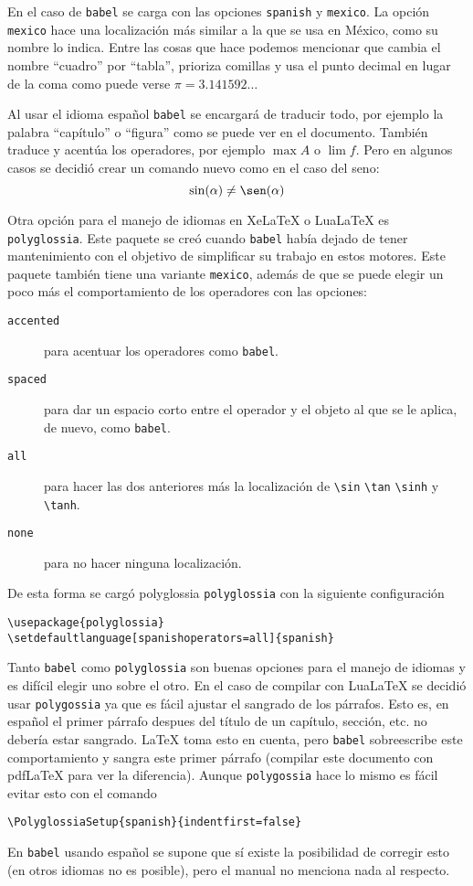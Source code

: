 En el caso de \texttt{babel} se carga con las opciones \texttt{spanish} y
\texttt{mexico}. La opción \texttt{mexico} hace una localización más similar
a la que se usa en México, como su nombre lo indica. Entre las cosas que
hace podemos mencionar que cambia el nombre ``cuadro'' por ``tabla'',
prioriza comillas y usa el punto decimal en lugar de la coma como puede
verse \(\pi=3.141592\ldots \)

Al usar el idioma español \texttt{babel} se encargará de traducir todo, por ejemplo la palabra ``capítulo'' o ``figura'' como se puede ver en el documento. También traduce y acentúa los operadores, por ejemplo \(\max A\) o \(\lim f\).%
\ifpdftex%
Pero en algunos casos se decidió crear un comando nuevo como en el caso del
seno:
\[
  \sin(\alpha)\ne\sen(\alpha)
\]
\fi

Otra opción para el manejo de idiomas en Xe\LaTeX{} o Lua\LaTeX{} es
\texttt{polyglossia}. Este paquete se creó cuando \texttt{babel} había
dejado de tener mantenimiento con el objetivo de simplificar su trabajo en
estos motores. Este paquete también tiene una variante \texttt{mexico},
además de que se puede elegir un poco más el comportamiento de los
operadores con las opciones:
\begin{description}
  \item[\texttt{accented}] para acentuar los operadores como \texttt{babel}.
  \item[\texttt{spaced}] para dar un espacio corto entre el operador y el objeto al que se le aplica, de nuevo, como \texttt{babel}.
  \item[\texttt{all}] para hacer las dos anteriores más la localización de \verb|\sin| \verb|\tan| \verb|\sinh| y \verb|\tanh|.
  \item[\texttt{none}] para no hacer ninguna localización.
\end{description}
De esta forma se cargó polyglossia \texttt{polyglossia} con la siguiente
configuración
\begin{flushleft}
  \verb|\usepackage{polyglossia}| \\
  \verb|\setdefaultlanguage[spanishoperators=all]{spanish}|
\end{flushleft}

Tanto \texttt{babel} como \texttt{polyglossia} son buenas opciones para el
manejo de idiomas y es difícil elegir uno sobre el otro. En el caso de
compilar con Lua\LaTeX{} se decidió usar \texttt{polygossia} ya que es fácil
ajustar el sangrado de los párrafos. Esto es, en español el primer párrafo
despues del título de un capítulo, sección, etc. no debería estar sangrado.
\LaTeX{} toma esto en cuenta, pero \texttt{babel} sobreescribe este
comportamiento y sangra este primer párrafo (compilar este documento con
pdf\LaTeX{} para ver la diferencia). Aunque \texttt{polygossia} hace lo
mismo es fácil evitar esto con el comando
\begin{flushleft}
  \verb|\PolyglossiaSetup{spanish}{indentfirst=false}|
\end{flushleft}
En \texttt{babel} usando español se supone que sí existe la posibilidad de
corregir esto (en otros idiomas no es posible), pero el manual no menciona
nada al respecto.


